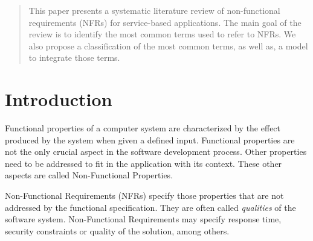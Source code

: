 \documentclass{sig-alternate}
\begin{document}
 
\maketitle
\begin{abstract} 
This paper presents a systematic literature review of non-functional
requirements (NFRs) for service-based applications. 
The main goal of the review is to identify the most common terms used to refer to NFRs.
We also propose a classification of the most common terms, as well as, a model to integrate those terms.
\end{abstract}




\section{Introduction}

Functional properties of a computer system are characterized by the effect produced by the system when given a defined input.
Functional properties are not the only crucial aspect in the software development process. 
Other properties need to be addressed to fit in the application with its context.
These other aspects are called Non-Functional Properties.

Non-Functional Requirements (NFRs) specify those properties that are not addressed by the functional  specification.
They are often called \textit{qualities} of the software system.
Non-Functional Requirements may specify response time, security constraints or quality of the solution, among others.
\end{document}
